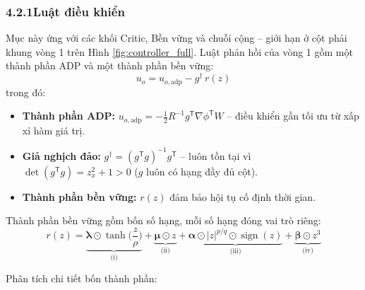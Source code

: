\documentclass[12pt,a4paper]{article}
\newcommand{\T}{\mathsf{T}}
\DeclareMathOperator{\sign}{sign}
\begin{document}
\subsubsection*{4.2.1\quad Luật điều khiển}

Mục này ứng với các khối Critic, Bền vững và chuỗi cộng -- giới hạn ở cột phải khung vòng 1 trên Hình \ref{fig:controller_full}. Luật phản hồi của vòng 1 gồm một thành phần ADP và một thành phần bền vững:
\begin{equation}\label{eq:ft_control}
    \boxed{u_o = u_{o,\text{adp}} - g^\dagger\, r(z)}
\end{equation}
trong đó:
\begin{itemize}[nosep]
    \item \textbf{Thành phần ADP:} $u_{o,\text{adp}} = -\frac{1}{2} R^{-1} g^\T \nabla\phi^\T W$ -- điều khiển gần tối ưu từ xấp xỉ hàm giá trị.
    \item \textbf{Giả nghịch đảo:} $g^\dagger = (g^\T g)^{-1} g^\T$ -- luôn tồn tại vì $\det(g^\T g) = z_x^2 + 1 > 0$ ($g$ luôn có hạng đầy đủ cột).
    \item \textbf{Thành phần bền vững:} $r(z)$ đảm bảo hội tụ cố định thời gian.
\end{itemize}

Thành phần bền vững gồm bốn số hạng, mỗi số hạng đóng vai trò riêng:
\begin{equation}\label{eq:robust}
    r(z) = \underbrace{\bm{\lambda} \odot \tanh\!\Big(\frac{z}{\rho}\Big)}_\text{(i)}
    + \underbrace{\bm{\mu} \odot z}_\text{(ii)}
    + \underbrace{\bm{\alpha} \odot |z|^{p/q} \odot \sign(z)}_\text{(iii)}
    + \underbrace{\bm{\beta} \odot z^3}_\text{(iv)}
\end{equation}

Phân tích chi tiết bốn thành phần:
\end{document}
